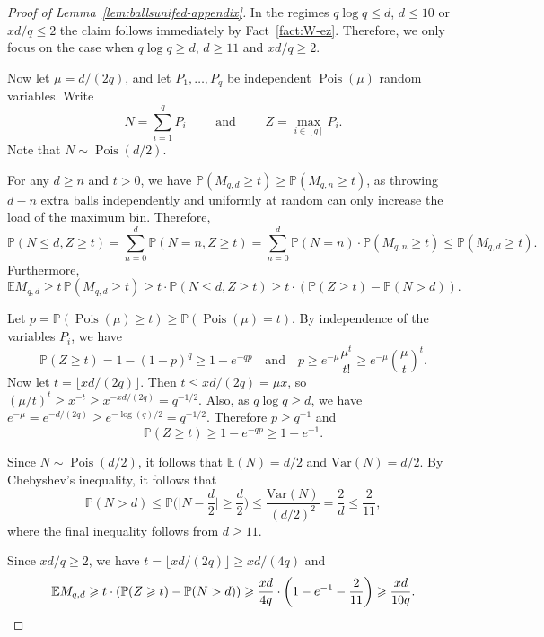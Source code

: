 \documentclass[12pt,reqno]{amsart}
\theoremstyle{remark}
\numberwithin{theorem}{section}
\renewcommand{\(}{\bigl(}
\renewcommand{\)}{\bigr)\vphantom{)}}
\renewcommand{\leq}{\le}
\renewcommand{\geq}{\ge}
\renewcommand{\le}{\leqslant}
\renewcommand{\ge}{\geqslant}
\newcommand{\EE}{\mathbb E}
\newcommand{\PP}{\mathbb P}
\DeclareMathOperator{\Pois}{Pois}
\begin{document}
\begin{proof}[Proof of Lemma~\ref{lem:ballsunifed-appendix}]
In the regimes $q\log q\leq d$, $d\leq 10$ or $xd/q\leq 2$ the claim follows immediately by Fact~\ref{fact:W-ez}. Therefore, we only focus on the case when $q\log q\geq d$, $d\geq 11$ and $xd/q\geq 2$.






Now let $\mu=d/(2q)$, and let $P_1,\dots,P_q$ be independent $\Pois(\mu)$ random variables. Write 
\[ N =\sum_{i=1}^q P_i \qquad \text{ and } \qquad Z=\max_{i\in[q]} P_i.\] Note that $N\sim \Pois(d/2)$.

For any $d\geq n$ and $t>0$, we have $\PP(M_{q,d}\geq t)\geq \PP(M_{q,n}\geq t)$, as throwing $d-n$ extra balls independently and uniformly at random can only increase the load of the maximum bin. Therefore,
\[\PP(N\leq d,Z\geq t) =\sum_{n=0}^d\PP(N=n,Z\geq t)=\sum_{n=0}^d\PP(N=n)\cdot \PP(M_{q,n}\geq t)\leq \PP(M_{q,d}\geq t).\]
Furthermore,
\[\mathbb E M_{q,d}\geq t\,\PP(M_{q,d}\geq t)\geq t\cdot \PP(N\leq d,Z\geq t)\geq t\cdot \left(\PP(Z\geq t)-\PP(N>d)\right).\]

 Let $p=\PP(\Pois(\mu)\geq t)\geq \PP(\Pois(\mu)=t)$. By independence of the variables $P_i$, we have
\[\PP(Z\geq t)=1-(1-p)^q\geq 1-e^{-qp} \quad \text{and} \quad p\geq e^{-\mu}\frac{\mu^t}{t!}\geq e^{-\mu}\left(\frac{\mu}{t}\right)^t.\]
Now let $t=\lfloor xd/(2q)\rfloor$. Then $t\leq xd/(2q)=\mu x$, so $(\mu/t)^t\geq x^{-t}\geq x^{-xd/(2q)}=q^{-1/2}$. Also, as $q\log q\geq d$, we have $e^{-\mu}=e^{-d/(2q)}\geq e^{-\log(q)/2}=q^{-1/2}$. Therefore $p\geq q^{-1}$ and
\[\PP(Z\geq t)\geq 1-e^{-qp}\geq 1-e^{-1}.\]

Since $N\sim \Pois(d/2)$, it follows that $\mathbb{E}(N) = d/2$ and $\mathrm{Var}(N) = d/2$. By Chebyshev's inequality, it follows that 
\[ \mathbb{P}(N>d) \leq \mathbb{P} \biggl( \bigg| N - \frac{d}{2} \biggr| \geq \frac{d}{2} \biggr) \leq \frac{\mathrm{Var}(N)}{(d/2)^2}= \frac{2}{d} \leq \frac{2}{11},\]
where the final inequality follows from $d \geq 11$. 

Since $xd/q\geq 2$, we have $t=\lfloor xd/(2q)\rfloor\geq xd/(4q)$ and
\[\mathbb E M_{q,d}\geq t\cdot \left(\PP(Z\geq t)-\PP(N>d)\right)\geq \frac{xd}{4q}\cdot \left(1-e^{-1}-\frac{2}{11}\right)\geq \frac{xd}{10q}.\qedhere\]
\end{proof}
\end{document}
